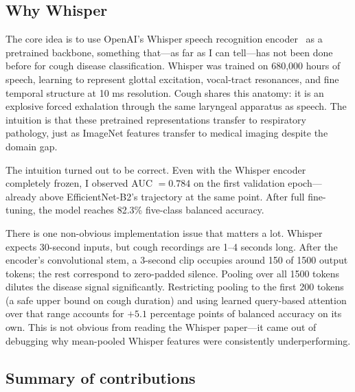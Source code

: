 \documentclass[10pt,journal,compsoc]{IEEEtran}
\begin{document}
\subsection{Why Whisper}

The core idea is to use OpenAI's Whisper speech recognition
encoder~\cite{whisper} as a pretrained backbone, something that---as far as
I can tell---has not been done before for cough disease classification.
Whisper was trained on 680{,}000 hours of speech, learning to represent
glottal excitation, vocal-tract resonances, and fine temporal structure
at 10 ms resolution. Cough shares this anatomy: it is an explosive forced
exhalation through the same laryngeal apparatus as speech.
The intuition is that these pretrained representations transfer to
respiratory pathology, just as ImageNet features transfer to medical imaging
despite the domain gap.

The intuition turned out to be correct. Even with the Whisper encoder
completely frozen, I observed AUC $= 0.784$ on the first validation epoch---
already above EfficientNet-B2's trajectory at the same point. After full
fine-tuning, the model reaches 82.3\% five-class balanced accuracy.

There is one non-obvious implementation issue that matters a lot.
Whisper expects 30-second inputs, but cough recordings are 1--4 seconds long.
After the encoder's convolutional stem, a 3-second clip occupies around
150 of 1500 output tokens; the rest correspond to zero-padded silence.
Pooling over all 1500 tokens dilutes the disease signal significantly.
Restricting pooling to the first 200 tokens (a safe upper bound on cough
duration) and using learned query-based attention over that range
accounts for $+5.1$ percentage points of balanced accuracy on its own.
This is not obvious from reading the Whisper paper---it came out of
debugging why mean-pooled Whisper features were consistently underperforming.

\subsection{Summary of contributions}
\end{document}
